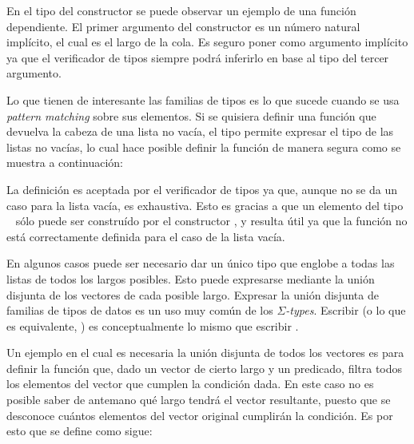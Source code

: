 En el tipo del constructor \AgdaFunction{\_::\_} se puede observar un ejemplo de una función dependiente. El primer argumento del constructor es un número natural  implícito, el cual es el largo de la cola. Es seguro poner  como argumento implícito ya que el verificador de tipos siempre podrá inferirlo en base al tipo del tercer argumento. 

Lo que tienen de interesante las familias de tipos es lo que sucede cuando se usa \textit{pattern matching} sobre sus elementos. Si se quisiera definir una función que devuelva la cabeza de una lista no vacía, el tipo  permite expresar el tipo de las listas no vacías, lo cual hace posible definir la función  de manera segura como se muestra a continuación: 


La definición es aceptada por el verificador de tipos ya que, aunque no se da un caso para la lista vacía, es exhaustiva. Esto es gracias a que un elemento del tipo \mbox{  \AgdaSymbol{(} \AgdaSymbol{)}} sólo puede ser construído por el constructor \AgdaFunction{\_::\_}, y resulta útil ya que la función  no está correctamente definida para el caso de la lista vacía.  

En algunos casos puede ser necesario dar un único tipo que englobe a todas las listas de todos los largos posibles. Esto puede expresarse mediante la unión disjunta de los vectores de cada posible largo. Expresar la unión disjunta de familias de tipos de datos es un uso muy común de los $\Sigma$\textit{-types}. Escribir  \AgdaSymbol{(} \AgdaSymbol{)} (o lo que es equivalente,  \AgdaSymbol{($\lambda$}  \AgdaSymbol{$\rightarrow$}  \AgdaSymbol{)}) es conceptualmente lo mismo que escribir  . 

Un ejemplo en el cual es necesaria la unión disjunta de todos los vectores es para definir la función  que, dado un vector de cierto largo  y un predicado, filtra todos los elementos del vector que cumplen la condición dada. En este caso no es posible saber de antemano qué largo tendrá el vector resultante, puesto que se desconoce cuántos elementos del vector original cumplirán la condición. Es por esto que se define como sigue:

